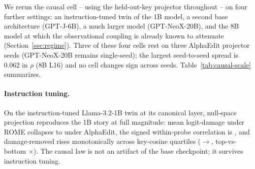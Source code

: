 We rerun the causal cell -- using the held-out-key projector throughout -- on
four further settings: an instruction-tuned twin of the 1B model, a second
base architecture (GPT-J-6B), a much larger model (GPT-NeoX-20B), and the 8B
model at which the observational coupling is already known to attenuate
(Section~\ref{sec:regime}). Three of these four cells rest on three AlphaEdit
projector seeds (GPT-NeoX-20B remains single-seed); the largest seed-to-seed
spread is 0.062 in $\rho$ (8B L16) and no cell changes sign across seeds.
Table~\ref{tab:causal-scale} summarizes.

\paragraph{Instruction tuning.} On the instruction-tuned Llama-3.2-1B twin at
its canonical layer, null-space projection reproduces the 1B story at full
magnitude: mean logit-damage \instructDmgRome{} under ROME collapses to
\instructDmgAlpha{} under AlphaEdit, the signed within-probe correlation is
\instructCausalRho{}, and damage-removed rises monotonically across key-cosine
quartiles (\instructQuartLo{}$\rightarrow$\instructQuartHi{}, top-vs-bottom
\instructRatio{}$\times$). The causal law is not an artifact of the base
checkpoint; it survives instruction tuning.

